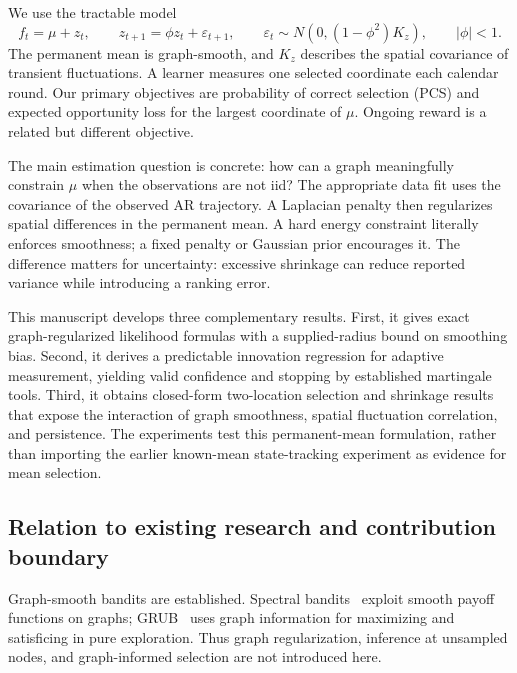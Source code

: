 \documentclass[11pt]{article}
\begin{document}
We use the tractable model
\begin{equation}
f_t=\mu+z_t,\qquad z_{t+1}=\phi z_t+\varepsilon_{t+1},\qquad
\varepsilon_t\sim N(0,(1-\phi^2)K_z),\qquad |\phi|<1.
\label{eq:model-intro}
\end{equation}
The permanent mean is graph-smooth, and $K_z$ describes the spatial covariance of transient fluctuations. A learner measures one selected coordinate each calendar round. Our primary objectives are probability of correct selection (PCS) and expected opportunity loss for the largest coordinate of $\mu$. Ongoing reward is a related but different objective.

The main estimation question is concrete: how can a graph meaningfully constrain $\mu$ when the observations are not iid? The appropriate data fit uses the covariance of the observed AR trajectory. A Laplacian penalty then regularizes spatial differences in the permanent mean. A hard energy constraint literally enforces smoothness; a fixed penalty or Gaussian prior encourages it. The difference matters for uncertainty: excessive shrinkage can reduce reported variance while introducing a ranking error.

This manuscript develops three complementary results. First, it gives exact graph-regularized likelihood formulas with a supplied-radius bound on smoothing bias. Second, it derives a predictable innovation regression for adaptive measurement, yielding valid confidence and stopping by established martingale tools. Third, it obtains closed-form two-location selection and shrinkage results that expose the interaction of graph smoothness, spatial fluctuation correlation, and persistence. The experiments test this permanent-mean formulation, rather than importing the earlier known-mean state-tracking experiment as evidence for mean selection.

\subsection{Relation to existing research and contribution boundary}
Graph-smooth bandits are established. Spectral bandits~\cite{valko2014} exploit smooth payoff functions on graphs; GRUB~\cite{thaker2022} uses graph information for maximizing and satisficing in pure exploration. Thus graph regularization, inference at unsampled nodes, and graph-informed selection are not introduced here.
\end{document}
